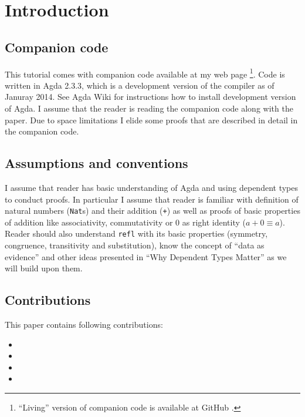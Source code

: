 \section{Introduction}

\subsection{Companion code}

This tutorial comes with companion code available at my web page \cite{js-webhome}\footnote{``Living'' version of companion code is available at GitHub \cite{js-github}.}. Code is written in Agda 2.3.3, which is a development version of the compiler as of Januray 2014. See Agda Wiki \cite{agda-wiki} for instructions how to install development version of Agda. I assume that the reader is reading the companion code along with the paper. Due to space limitations I elide some proofs that are described in detail in the companion code.

\subsection{Assumptions and conventions}

I assume that reader has basic understanding of Agda and using dependent types to conduct proofs. In particular I assume that reader is familiar with definition of natural numbers (\texttt{Nat}s) and their addition (\texttt{+}) as well as proofs of basic properties of addition like associativity, commutativity or 0 as right identity ($a + 0 ≡ a$). Reader should also understand \texttt{refl} with its basic properties (symmetry, congruence, transitivity and substitution), know the concept of ``data as evidence'' and other ideas presented in ``Why Dependent Types Matter'' \cite{AltMcBMcK05} as we will build upon them.

\subsection{Contributions}

This paper contains following contributions:

\begin{itemize}
 \item %
 \item %
 \item %
 \item %
\end{itemize}
